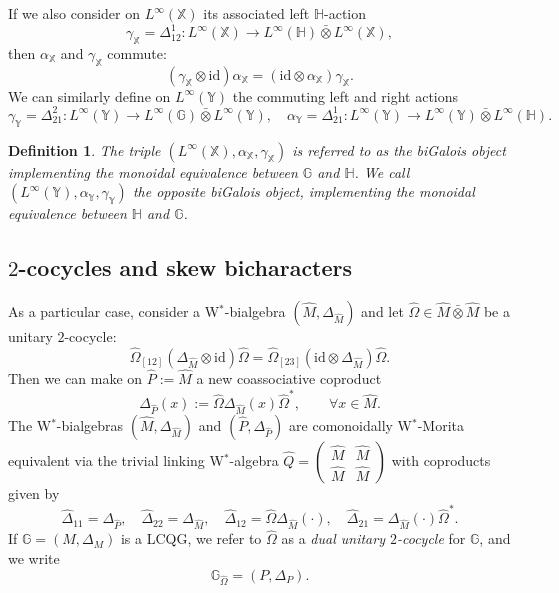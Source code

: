 \documentclass[reqno]{amsart}
\numberwithin{equation}{section}
\newtheorem{Def}[Theorem]{Definition}
\newcommand{\id}{\mathrm{id}}
\newcommand{\G}{\mathbb{G}}
\newcommand{\Hh}{\mathbb{H}}
\newcommand{\X}{\mathbb{X}}
\newcommand{\Y}{\mathbb{Y}}
\begin{document}
If we also consider on $L^{\infty}(\X)$ its associated left $\Hh$-action 
\begin{equation}\label{EqFormGamm}
\gamma_{\X} = \Delta_{12}^1\colon L^{\infty}(\X) \rightarrow L^{\infty}(\Hh)\bar{\otimes} L^{\infty}(\X),
\end{equation}
then $\alpha_{\X}$ and $\gamma_{\X}$ commute:
\[
(\gamma_{\X}\otimes \id)\alpha_{\X} = (\id\otimes \alpha_{\X})\gamma_{\X}.
\] 
We can similarly define on $L^{\infty}(\Y)$ the commuting left and right actions 
\[
\gamma_{\Y} = \Delta_{21}^2\colon L^{\infty}(\Y)\rightarrow L^{\infty}(\G)\bar{\otimes}L^{\infty}(\Y),\quad \alpha_{\Y} = \Delta_{21}^1\colon L^{\infty}(\Y) \rightarrow L^{\infty}(\Y)\bar{\otimes} L^{\infty}(\Hh). 
\]
\begin{Def}
The triple $(L^{\infty}(\X),\alpha_{\X},\gamma_{\X})$ is referred to as the \emph{biGalois object} implementing the monoidal equivalence between $\G$ and $\Hh$. We call $(L^{\infty}(\Y),\alpha_{\Y},\gamma_{\Y})$ the \emph{opposite} biGalois object, implementing the monoidal equivalence between $\Hh$ and $\G$.
\end{Def}


\subsection{\texorpdfstring{$2$}{2}-cocycles and skew bicharacters}\label{SubSecCocBich}

As a particular case, consider a W$^*$-bialgebra $(\hat{M},\Delta_{\hat{M}})$ and let $\hat{\Omega} \in \hat{M} \bar{\otimes} \hat{M}$ be a unitary $2$-cocycle: 
\[
\hat{\Omega}_{[12]}(\Delta_{\hat{M}}\otimes \id)\hat{\Omega}= \hat{\Omega}_{[23]}(\id\otimes \Delta_{\hat{M}})\hat{\Omega}. 
\]
Then we can make on $\hat{P}:= \hat{M}$ a new coassociative coproduct 
\[
\Delta_{\hat{P}}(x) := \hat{\Omega} \Delta_{\hat{M}}(x)\hat{\Omega}^*,\qquad \forall x\in \hat{M}.
\]
The W$^*$-bialgebras $(\hat{M},\Delta_{\hat{M}})$ and $(\hat{P},\Delta_{\hat{P}})$ are comonoidally W$^*$-Morita equivalent via  the trivial linking W$^*$-algebra
$\hat{Q} = \begin{pmatrix} \hat{M} & \hat{M} \\ \hat{M} & \hat{M} \end{pmatrix}$ with coproducts given by 
\begin{equation}\label{EqCoprodCocTwist}
\hat{\Delta}_{11}=\Delta_{\hat{P}},\quad \hat{\Delta}_{22}=\Delta_{\hat{M}},\quad
\hat{\Delta}_{12} = \hat{\Omega}\Delta_{\hat{M}}(\cdot),\quad \hat{\Delta}_{21} = \Delta_{\hat{M}}(\cdot)\hat{\Omega}^*.
\end{equation}
If $\G= (M,\Delta_M)$ is a LCQG, we refer to $\hat{\Omega}$ as a \emph{dual unitary $2$-cocycle} for $\G$, and we write
\begin{equation}
\G_{\hat{\Omega}} = (P,\Delta_P).
\end{equation}
\end{document}
